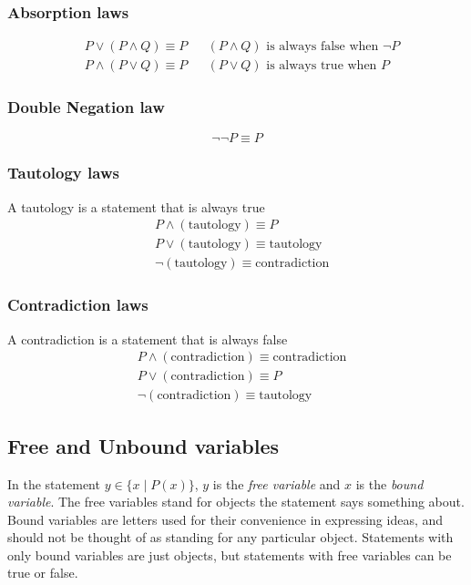 \documentclass{article}
\begin{document}
\subsubsection{Absorption laws}
	\begin{align*}
		&P\vee (P\wedge Q)\equiv P&&(P\wedge Q)\text{ is always false when \(\neg P\)}\\
		&P\wedge (P\vee Q)\equiv P&&(P\vee Q)\text{ is always true when \(P\)}
	\end{align*}
\subsubsection{Double Negation law}
	\begin{displaymath}
		\neg\neg P\equiv P
	\end{displaymath}
\subsubsection{Tautology laws}
	A tautology is a statement that is always true
	\begin{align*}
		&P\wedge(\text{tautology})\equiv P\\
		&P\vee(\text{tautology})\equiv \text{tautology}\\
		&\neg(\text{tautology})\equiv \text{contradiction}
	\end{align*}
\subsubsection{Contradiction laws}
	A contradiction is a statement that is always false
	\begin{align*}
		&P\wedge(\text{contradiction})\equiv \text{contradiction}\\
		&P\vee(\text{contradiction})\equiv P\\
		&\neg(\text{contradiction})\equiv \text{tautology}
	\end{align*}
\subsection{Free and Unbound variables}
In the statement \(y\in\{x\mid P(x)\}\), \(y\) is the \emph{free variable} and \(x\) is the \emph{bound variable}. The free variables stand for objects the statement says something about. Bound variables are letters used for their convenience in expressing ideas, and should not be thought of as standing for any particular object. Statements with only bound variables are just objects, but statements with free variables can be true or false.
\end{document}

